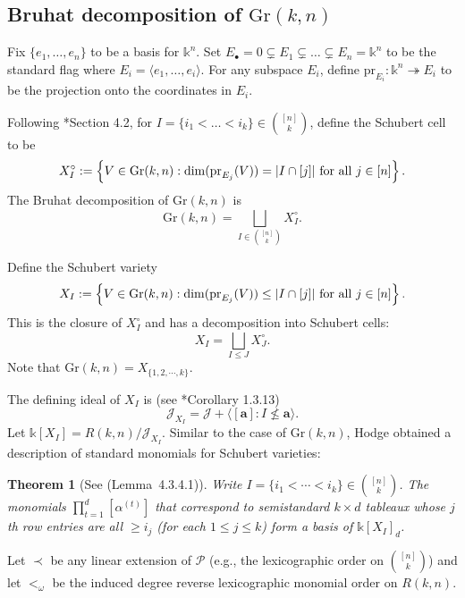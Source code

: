\documentclass[12pt,reqno]{amsart}
\newtheorem{theorem}[lemma]{Theorem}
\theoremstyle{definition}
\renewcommand{\aa}{\mathbf a}
\renewcommand{\k}{\mathbb{k}}
\newcommand{\cJ}{\mathcal{J}}
\DeclarePairedDelimiter\abs{\lvert}{\rvert}%
\newcommand{\gr}{\mathrm{Gr}}
\begin{document}
\subsection{Bruhat decomposition of \texorpdfstring{$\gr(k,n)$}{Gr(k,n)}}

Fix $\{e_1,\dots,e_n\}$ to be a basis for $\k^n$. Set $E_\bullet = 0\subsetneq E_1 \subsetneq \dots \subsetneq E_{n} = \k^n$ to be the standard flag where $E_i = \langle e_1,\dots,e_i\rangle$. For any subspace $E_i$, define $\mathrm{pr}_{E_i}:\k^n\twoheadrightarrow E_i$ to be the  projection onto the coordinates in $E_i$. 

Following \cite{KLS13juggling}*{Section 4.2}, for $I = \{i_1<\dots<i_k\}\in {[n]\choose k}$, define the Schubert cell to be
\begin{equation}\label{eqn:Schubertcell}
    X_I^\circ:= \left\{V\in \gr(k,n): \dim(\mathrm{pr}_{E_j}(V)) = \abs{I\cap [j]}\text{ for all }j\in [n]\right\}.
\end{equation}
The Bruhat decomposition of $\gr(k,n)$ is 
\begin{equation}\label{eqn:Bruhat}
    \gr(k,n) = \bigsqcup_{I\in {[n]\choose k}}X_I^\circ.
\end{equation}


Define the Schubert variety 
\begin{equation}\label{eqn:Schubertvariety}
    X_I:= \left\{V\in \gr(k,n): \dim(\mathrm{pr}_{E_j}(V)) \leq \abs{I\cap [j]}\text{ for all }j\in [n]\right\}.
\end{equation}
This is the closure of $X_I^\circ$ and has a decomposition into Schubert cells:
\[X_I = \bigsqcup_{I\leq J} X_J^\circ.\]
  Note that $\gr(k,n) = X_{\{1,2,\cdots, k\}}$. 

The defining ideal of $X_I$ is (see \cite{S07}*{Corollary 1.3.13})
\[\cJ_{X_I} = \cJ + \langle [\aa]: I\nleq \aa \rangle. \]
Let $\k[X_I] = R(k,n)/\cJ_{X_I}$. Similar to the case of $\gr(k,n)$, Hodge obtained a description of standard monomials for Schubert varieties:

\begin{theorem}[See \cite{lakshmibai2008standard} (Lemma~4.3.4.1)]
Write \(I=\{i_1<\cdots<i_k\}\in \binom{[n]}{k}\).
The monomials \(\prod_{t=1}^d[\alpha^{(t)}]\) that correspond to semistandard
\(k\times d\) tableaux whose \(j\)th row entries are all \(\ge i_j\) (for each
\(1\le j\le k\)) form a basis of \(\k[X_I]_d\).
\end{theorem}



Let $\prec$ be any linear extension of $\mathcal{P}$
(e.g., the lexicographic order on $\binom{[n]}{k}$) and let $<_\omega$ be the induced degree reverse lexicographic monomial order on $R(k,n)$. 
\end{document}
